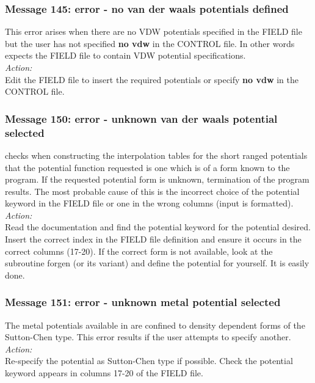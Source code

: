 \subsubsection*{Message 145: error - no van der waals potentials defined}

This error arises when there are no VDW potentials specified in the
FIELD file but the user has not specified {\bf no vdw} in the CONTROL
file.  In other words \D{} expects the FIELD file to contain VDW
potential specifications. \\

\noindent
{\em Action:} \\ 
Edit the FIELD file to insert the required potentials  or specify {\bf
no vdw} in the CONTROL file.

\subsubsection*{Message 150: error - unknown van der waals potential selected}

\D{} checks when constructing the interpolation tables for the short ranged
potentials that the potential function requested is
one which is of a form known to the program. If the requested
potential form is unknown, termination of the program results.
The most probable cause of this is the incorrect choice of the potential
keyword in the FIELD file or one in the wrong columns (input is formatted). \\ 

\noindent
{\em Action:} \\ 
Read the \D{} documentation and find the potential keyword for the
potential desired. Insert the correct index in the FIELD file
definition and ensure it occurs in the correct columns (17-20).
If the correct form is not available, look at the
subroutine {\sc forgen} (or its variant) and define the potential
for yourself. It is easily done.

\subsubsection*{Message 151: error - unknown metal potential selected}

The metal potentials  available in \D{} are confined to density
dependent forms of the Sutton-Chen type. This error results if the
user attempts to specify another.\\

\noindent
{\em Action:} \\
Re-specify the potential as Sutton-Chen type if possible. Check the potential keyword
appears in columns 17-20 of the FIELD file.

